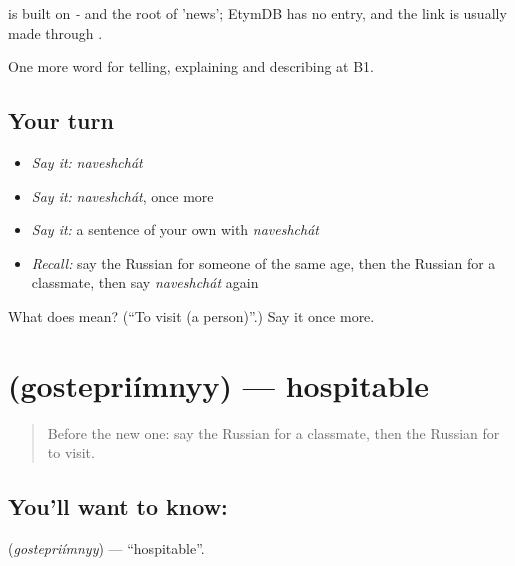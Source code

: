 \begin{cousinweb}
\emph{} is built on \emph{-} and the root of \emph{} 'news'; EtymDB has no entry, and the link is usually made through \emph{}.
\end{cousinweb}

\begin{grammarlens}[title={What you've built}]
One more word for telling, explaining and describing at B1.
\end{grammarlens}

\subsection*{Your turn}
\begin{itemize}
\raggedright
  \item \emph{Say it:} \emph{naveshchát}
  \item \emph{Say it:} \emph{naveshchát}, once more
  \item \emph{Say it:} a sentence of your own with \emph{naveshchát}
  \item \emph{Recall:} say the Russian for someone of the same age, then the Russian for a classmate, then say \emph{naveshchát} again
\end{itemize}

\begin{tcolorbox}[breakable,colback=teal!4,colframe=teal!35!black,title={Before you move on}]
What does  mean? (\textquotedblleft{}To visit (a person)\textquotedblright{}.) Say it once more.
\end{tcolorbox}
\section[\texorpdfstring{\ru{гостеприимный} (gostepriímnyy)}{гостеприимный (gostepriímnyy)}]{ (gostepriímnyy) — hospitable}

\label{lesson:RU-C499-gostepriimnyy}



\begin{quote}
Before the new one: say the Russian for a classmate, then the Russian for to visit.
\end{quote}

\subsection*{You'll want to know: }
\textbf{} (\emph{gostepriímnyy}) — \textquotedblleft{}hospitable\textquotedblright{}.

